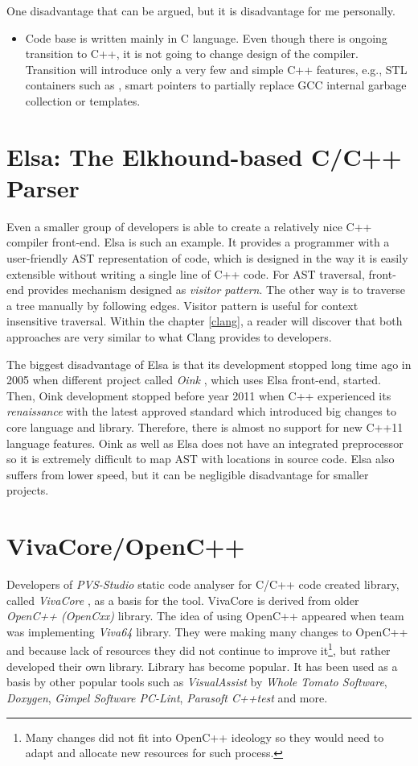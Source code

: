 One disadvantage that can be argued, but it is disadvantage for me personally.

\begin{itemize}
\item Code base is written mainly in C language. Even though there is ongoing transition to C++, it is not going to change design of the compiler. Transition will introduce only a very few and simple C++ features, e.g., STL containers such as , smart pointers to partially replace GCC internal garbage collection or templates.
\end{itemize}

\section{Elsa: The Elkhound-based C/C++ Parser}
Even a smaller group of developers is able to create a relatively nice C++ compiler front-end. Elsa \cite{elsa} is such an example. It provides a programmer with a user-friendly AST representation of code, which is designed in the way it is easily extensible without writing a single line of C++ code. For AST traversal, front-end provides mechanism designed as \emph{visitor pattern}. The other way is to traverse a tree manually by following edges. Visitor pattern is useful for context insensitive traversal. Within the chapter \ref{clang}, a reader will discover that both approaches are very similar to what Clang provides to developers.

The biggest disadvantage of Elsa is that its development stopped long time ago in 2005 when different project called \emph{Oink} \cite{oink}, which uses Elsa front-end, started. Then, Oink development stopped before year 2011 when C++ experienced its \textit{renaissance} with the latest approved standard which introduced big changes to core language and library. Therefore, there is almost no support for new C++11 language features. Oink as well as Elsa does not have an integrated preprocessor so it is extremely difficult to map AST with locations in source code. Elsa also suffers from lower speed, but it can be negligible disadvantage for smaller projects.

\section{VivaCore/OpenC++}
Developers of \emph{PVS-Studio} \cite{pvs-studio} static code analyser for C/C++ code created library, called \emph{VivaCore} \cite{vivacore}, as a basis for the tool. VivaCore is derived from older \emph{OpenC++ (OpenCxx)} \cite{opencxx} library. The idea of using OpenC++ appeared when team was implementing \emph{Viva64} \cite{vivacore} library. They were making many changes to OpenC++ and because lack of resources they did not continue to improve it\footnote{Many changes did not fit into OpenC++ ideology so they would need to adapt and allocate new resources for such process.}, but rather developed their own library. Library has become popular. It has been used as a basis by other popular tools such as  \emph{VisualAssist} by \emph{Whole Tomato Software}, \emph{Doxygen}, \emph{Gimpel Software PC-Lint}, \emph{Parasoft C++test} and more.

